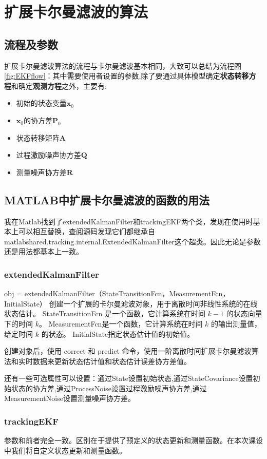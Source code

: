 \documentclass{article}
\begin{document}
\section{扩展卡尔曼滤波的算法}
\subsection{流程及参数}
扩展卡尔曼滤波算法的流程与卡尔曼滤波基本相同，大致可以总结为流程图\ref{fig:EKFflow}：其中需要使用者设置的参数,除了要通过具体模型确定\textbf{状态转移方程}和确定\textbf{观测方程}之外，主要有:
\begin{itemize}
    \item 初始的状态变量$\mathbf{x}_{0}$
    \item $\mathbf{x}_{0}$的协方差$\mathbf{P}_{0}$
    \item 状态转移矩阵$\mathbf{A}$
    \item 过程激励噪声协方差$\mathbf{Q}$
    \item 测量噪声协方差$\mathbf{R}$
\end{itemize}

\subsection{MATLAB中扩展卡尔曼滤波的函数的用法}
我在Matlab找到了extendedKalmanFilter和trackingEKF两个类，发现在使用时基本上可以相互替换，查阅源码发现它们都继承自matlabshared.tracking.internal.ExtendedKalmanFilter这个超类。因此无论是参数还是用法都基本上一致。
\subsubsection{extendedKalmanFilter}
obj = extendedKalmanFilter（StateTransitionFcn，MeasurementFcn，InitialState） 创建一个扩展的卡尔曼滤波对象，用于离散时间非线性系统的在线状态估计。 StateTransitionFcn 是一个函数，它计算系统在时间 $k-1$ 的状态向量下的时间 $k$。 MeasurementFcn是一个函数，它计算系统在时间 $k$ 的输出测量值，给定时间 $k$ 的状态。 InitialState指定状态估计值的初始值。

创建对象后，使用 correct 和 predict 命令，使用一阶离散时间扩展卡尔曼滤波算法和实时数据来更新状态估计值和状态估计误差协方差值。

还有一些可选属性可以设置：通过State设置初始状态,通过StateCovariance设置初始状态的协方差,通过ProcessNoise设置过程激励噪声协方差,通过MeasurementNoise设置测量噪声协方差。

\subsubsection{trackingEKF}
参数和前者完全一致。区别在于提供了预定义的状态更新和测量函数。在本次课设中我们将自定义状态更新和测量函数。
\end{document}
